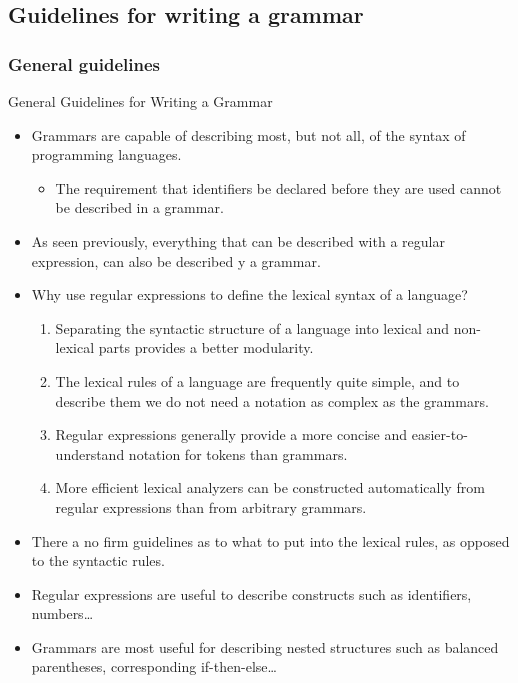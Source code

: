 \begin{bibunit}[apalike]
\subsection{Guidelines for writing a grammar}

\subsubsection{General guidelines}

\tableofcontentslide[sectionstyle={show/shaded},subsectionstyle={show/shaded/hide},subsubsectionstyle={show/show/hide/hide}]

\begin{frame}[allowframebreaks]{General Guidelines for Writing a Grammar}
	\begin{itemize}
	\item Grammars are capable of describing most, but not all, of the syntax of programming languages.
		\begin{itemize}
		\item The requirement that identifiers be declared before they are used cannot be described in a grammar.
		\end{itemize}
	\item As seen previously, everything that can be described with a regular expression, can also be described y a grammar.
	\item Why use regular expressions to define the lexical syntax of a language?
		\begin{enumerate}
		\item Separating the syntactic structure of a language into lexical and non-lexical parts provides a better modularity.
		\item The lexical rules of a language are frequently quite simple, and to describe them we do not need a notation as complex as the grammars.
		\item Regular expressions generally provide a more concise and easier-to-understand notation for tokens than grammars.
		\item More efficient lexical analyzers can be constructed automatically from regular expressions than from arbitrary grammars.
		\end{enumerate}
	\item There a no firm guidelines as to what to put into the lexical rules, as opposed to the syntactic rules.
	\item Regular expressions are useful to describe constructs such as identifiers, numbers\dots
	\item Grammars are most useful for describing nested structures such as balanced parentheses, corresponding if-then-else\dots
	\end{itemize}
\end{frame}


\end{bibunit}
